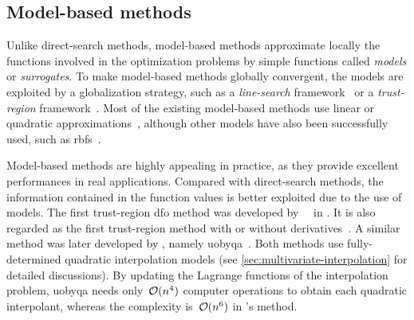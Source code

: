 \subsection{Model-based methods}
\label{subsec:model-based-methods}

Unlike direct-search methods, model-based methods approximate locally the functions involved in the optimization problems by simple functions called \emph{models} or \emph{surrogates}.
To make model-based methods globally convergent, the models are exploited by a globalization strategy, such as a \emph{line-search} framework~\cite[Ch.~3]{Nocedal_Wright_2006} or a \emph{trust-region} framework~\cite{Conn_Gould_Toint_2000,Yuan_2015}.
Most of the existing model-based methods use linear or quadratic approximations~\cite{Powell_1994,Conn_Scheinberg_Vicente_2008a,Conn_Scheinberg_Vicente_2008b}, although other models have also been successfully used, such as \glspl{rbf}~\cite{Powell_2004a,Oeuvray_2005}.

Model-based methods are highly appealing in practice, as they provide excellent performances in real applications.
Compared with direct-search methods, the information contained in the function values is better exploited due to the use of models.
The first trust-region \gls{dfo} method was developed by~\citeauthor{Winfield_1969}~\cite{Winfield_1969,Winfield_1973} in \citeyear{Winfield_1969}.
It is also regarded as the first trust-region method with or without derivatives~\cite[\S~1.2]{Conn_Gould_Toint_2000}.
A similar method was later developed by \citeauthor{Powell_2002}, namely \gls{uobyqa}~\cite{Powell_2002}.
Both methods use fully-determined quadratic interpolation models (see \cref{sec:multivariate-interpolation} for detailed discussions).
By updating the Lagrange functions of the interpolation problem, \gls{uobyqa} needs only~$\operatorname{\mathcal{O}}(n^4)$ computer operations to obtain each quadratic interpolant, whereas the complexity is~$\operatorname{\mathcal{O}}(n^6)$ in \citeauthor{Winfield_1969}'s method.

